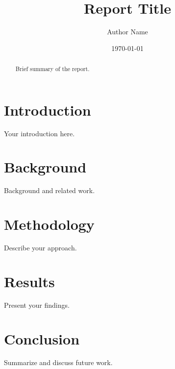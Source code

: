 \documentclass[12pt, a4paper]{article}
\title{Report Title}
\author{Author Name}
\date{\today}
\begin{document}
\maketitle

\begin{abstract}
  Brief summary of the report.
\end{abstract}

\tableofcontents
\newpage

\section{Introduction}
Your introduction here.

\section{Background}
Background and related work.

\section{Methodology}
Describe your approach.

\section{Results}
Present your findings.

\section{Conclusion}
Summarize and discuss future work.



\end{document}
